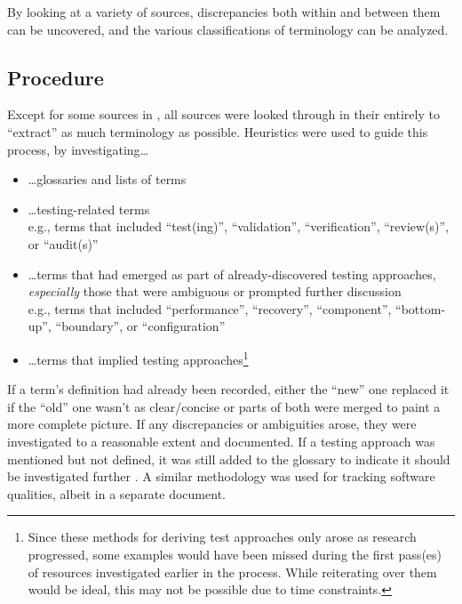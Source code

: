 By looking at a variety of sources, discrepancies both within and between them
can be uncovered, and the various classifications of terminology can be
analyzed.

\subsection{Procedure}

Except for some sources in , all sources were looked
through in their entirely to ``extract'' as much terminology as possible.
Heuristics were used to guide this process, by investigating\dots

\begin{itemize}
      \item \dots glossaries and lists of terms
      \item \dots testing-related terms\\
            e.g., terms that included ``test(ing)'', ``validation'',
            ``verification'', ``review(s)'', or ``audit(s)''
      \item \dots terms that had emerged as part of already-discovered
            testing approaches, \emph{especially} those that were ambiguous
            or prompted further discussion\\
            e.g., terms that included ``performance'', ``recovery'',
            ``component'', ``bottom-up'', ``boundary'', or ``configuration''
      \item \dots terms that implied testing approaches\footnote{
                  Since these methods for deriving test approaches only arose
                  as research progressed, some examples would have been missed
                  during the first pass(es) of resources investigated earlier
                  in the process. While reiterating over them would be ideal,
                  this may not be possible due to time constraints.
            }%
\end{itemize}

If a term's definition had already been recorded, either the ``new'' one
replaced it if the ``old'' one wasn't as clear/concise or parts of both were
merged to paint a more complete picture. If any discrepancies or ambiguities
arose, they were investigated to a reasonable extent and documented. If a
testing approach was mentioned but not defined, it was still added to the
glossary to indicate it should be investigated further%
. A similar methodology
was used for tracking software qualities, albeit in a separate
document.

